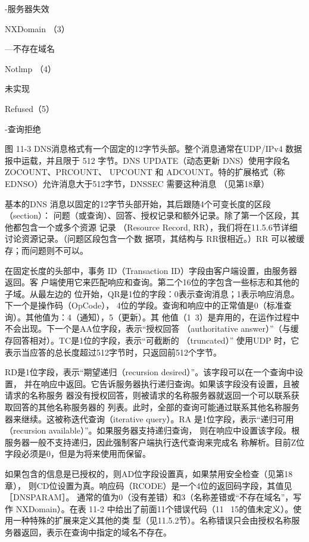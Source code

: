 -服务器失效

NXDomain （3）

—不存在域名

Notlmp （4）

未实现

Refused（5）

-查询拒绝

图 11-3
DNS消息格式有一个固定的12字节头部。整个消息通常在UDP/IPv4 数据报中运载，并且限于
512 字节。DNS UPDATE（动态更新 DNS）使用字段名 ZOCOUNT、PRCOUNT、 UPCOUNT 和
ADCOUNT。特的扩展格式（称 EDNSO）允许消息大于512字节，DNSSEC 需要这种消息
（见第18章）

基本的DNS 消息以固定的12字节头部开始，其后跟随4个可变长度的区段（section）：
问题（或查询）、回答、授权记录和额外记录。除了第一个区段，其他都包含一个或多个资源
记录 （Resource Record, RR），我们将在11.5.6节详细讨论资源记录。（问题区段包含一个数
据项，其结构与 RR很相近。）RR 可以被缓存；而问题则不可以。

在固定长度的头部中，事务 ID（Transaction ID）字段由客户端设置，由服务器返回。客
户端使用它来匹配响应和查询。第二个16位的字包含一些标志和其他的子域。从最左边的
位开始，QR是1位的字段：0表示查询消息；1表示响应消息。下一个是操作码（OpCode），
4位的学段。查询和响应中的正常值是0（标准查询）。其他值为：4（通知），5（更新）。其
他值（1~3）是弃用的，在运作过程中不会出现。下一个是AA位字段，表示“授权回答
（authoritative answer）”（与缓存回答相对）。TC是1位的字段，表示“可截断的 （truncated）”
使用UDP 时，它表示当应答的总长度超过512字节时，只返回前512个字节。

RD是1位字段，表示“期望递归（recursion desired）”。该字段可以在一个查询中设置，
并在响应中返回。它告诉服务器执行递归查询。如果该字段没有设置，且被请求的名称服务
器没有授权回答，则被请求的名称服务器就返回一个可以联系获取回答的其他名称服务器的
列表。此时，全部的查询可能通过联系其他名称服务器来继续。这被称迭代查询（iterative
query）。RA 是1位字段，表示“递归可用（recursion available）”。如果服务器支持递归查询，
则在响应中设置该字段。根服务器一般不支持递归，因此强制客户端执行迭代查询来完成名
称解析。目前Z位字段必须是0，但是为将来使用而保留。

如果包含的信息是已授权的，则AD位字段设置真，如果禁用安全检查（见第18章），
则CD位设置为真。响应码（RCODE）是一个4位的返回码字段，其值见 ［DNSPARAM］。
通常的值为0（没有差错）和3（名称差错或“不存在域名”，写作 NXDomain）。在表 11-2
中给出了前面11个错误代码（11 ~15的值未定义）。使用一种特殊的扩展来定义其他的类
型（见11.5.2节）。名称错误只会由授权名称服务器返回，表示在查询中指定的域名不存在。

